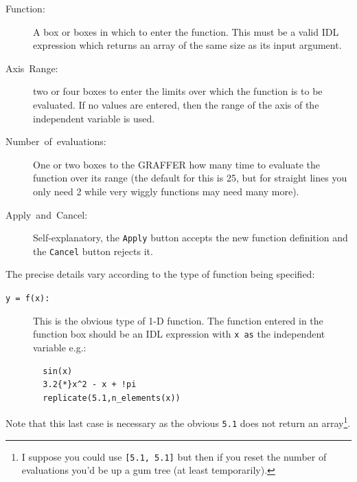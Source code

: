 \documentclass[11pt,twoside,english]{article}
\begin{document}
\begin{description}
\item [Function:]A box or boxes in which to enter the function. This
  must be a valid IDL expression which returns an array of the same
  size as its input argument.
\item [Axis~Range:]two or four boxes to enter the limits over which the
  function is to be evaluated. If no values are entered, then the range
  of the axis of the independent variable is used.
\item [Number~of~evaluations:]One or two boxes to the GRAFFER how many
  time to evaluate the function over its range (the default for this is
  25, but for straight lines you only need 2 while very wiggly
  functions may need many more).
\item [Apply~\textmd{and}~Cancel:]Self-explanatory, the \texttt{Apply}
  button accepts the new function definition and the \texttt{Cancel}
  button rejects it.
\end{description}
The precise details vary according to the type of function being
specified:

\begin{description}
\item [\texttt{y~=~f(x):}]This is the obvious type of 1-D function. The
  function entered in the function box should be an IDL expression with
  \texttt{x as} the independent variable e.g.:

\begin{verbatim}
  sin(x)
  3.2{*}x^2 - x + !pi
  replicate(5.1,n_elements(x))
\end{verbatim}
\end{description}
Note that this last case is necessary as the obvious \texttt{5.1} does
not return an array\footnote{I suppose you could use \texttt{{[}5.1,
    5.1{]}} but then if you reset the number of evaluations you'd be up
  a gum tree (at least temporarily).}.
\end{document}
